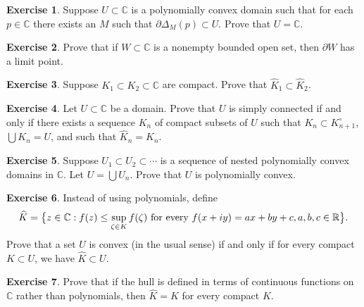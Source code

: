 \documentclass[12pt,openany]{book}
\newcommand{\avoidbreak}{\postdisplaypenalty=100}
\newcommand{\C}{{\mathbb{C}}}
\newcommand{\R}{{\mathbb{R}}}
\theoremstyle{plain}
\theoremstyle{remark}
\theoremstyle{definition}
\newenvironment{exbox}{%
    \def\FrameCommand{\vrule width 1pt \relax\hspace{10pt}}%
    \MakeFramed{\advance\hsize-\width\FrameRestore}%
}{%
    \endMakeFramed
}
\theoremstyle{exercise}
\newtheorem{exercise}{Exercise}[section]
\theoremstyle{example}
\begin{document}
\begin{exbox}
\begin{exercise}
Suppose $U \subset \C$ is a polynomially convex domain such that for each
$p \in \C$ there exists an $M$ such that $\partial \Delta_M(p) \subset U$.
Prove that $U = \C$.
\end{exercise}

\begin{exercise}
Prove that if $W \subset \C$ is a nonempty bounded open set, then $\partial W$ has a
limit point.
\end{exercise}

\begin{exercise}
Suppose $K_1 \subset K_2 \subset \C$ are compact.  Prove that
$\widehat{K}_1 \subset \widehat{K}_2$.
\end{exercise}

\begin{exercise}
Let $U \subset \C$ be a domain.  Prove that $U$
is simply connected if and only if there exists a sequence $K_n$
of compact subsets of $U$ such that $K_n \subset K^\circ_{n+1}$,
$\bigcup K_n = U$, and such that $\widehat{K}_n = K_n$.
\end{exercise}

\begin{exercise}
Suppose $U_1 \subset U_2 \subset \cdots$ is a sequence
of nested polynomially convex domains in $\C$.  Let $U = \bigcup U_n$.
Prove that $U$ is polynomially convex.
\end{exercise}

\begin{exercise}
Instead of using polynomials, define
\begin{equation*}
\widehat{K} = \bigl\{ z \in \C : f(z) \leq \sup_{\zeta \in K}
f(\zeta) \text{ for every } f(x+iy) = ax+by + c, 
a,b,c \in \R
\bigr\}.
\avoidbreak
\end{equation*}
Prove that a set $U$ is convex (in the usual sense) if and only
if for every compact $K \subset U$, we have $\widehat{K} \subset U$.
\end{exercise}

\begin{exercise}
Prove that if the hull is defined in terms of continuous functions on $\C$
rather than polynomials, then $\widehat{K} = K$ for every compact $K$.
\end{exercise}
\end{exbox}

\end{document}
